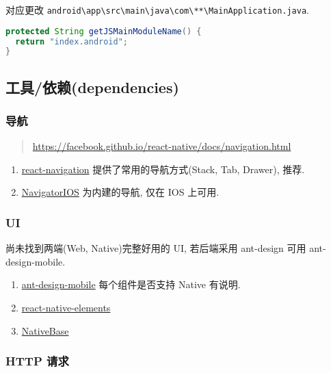 对应更改
\lstinline!android\app\src\main\java\com\**\MainApplication.java!.

\begin{lstlisting}[language=Java]
protected String getJSMainModuleName() {
  return "index.android";
}
\end{lstlisting}

\subsection{工具/依赖(dependencies)}\label{ux5de5ux5177ux4f9dux8d56dependencies}

\subsubsection{导航}\label{ux5bfcux822a}

\begin{quote}
\url{https://facebook.github.io/react-native/docs/navigation.html}
\end{quote}

\begin{enumerate}
\def\labelenumi{\arabic{enumi}.}
\tightlist
\item
  \href{https://github.com/react-navigation/react-navigation}{react-navigation}
  提供了常用的导航方式(Stack, Tab, Drawer), 推荐.
\item
  \href{https://facebook.github.io/react-native/docs/navigatorios.html}{NavigatorIOS}
  为内建的导航, 仅在 IOS 上可用.
\end{enumerate}

\subsubsection{UI}\label{ui-1}

尚未找到两端(Web, Native)完整好用的 UI, 若后端采用 ant-design 可用
ant-design-mobile.

\begin{enumerate}
\def\labelenumi{\arabic{enumi}.}
\tightlist
\item
  \href{https://github.com/ant-design/ant-design-mobile}{ant-design-mobile}
  每个组件是否支持 Native 有说明.
\item
  \href{https://github.com/react-native-training/react-native-elements}{react-native-elements}
\item
  \href{https://github.com/GeekyAnts/NativeBase}{NativeBase}
\end{enumerate}

\subsubsection{HTTP 请求}\label{http-ux8bf7ux6c42}

